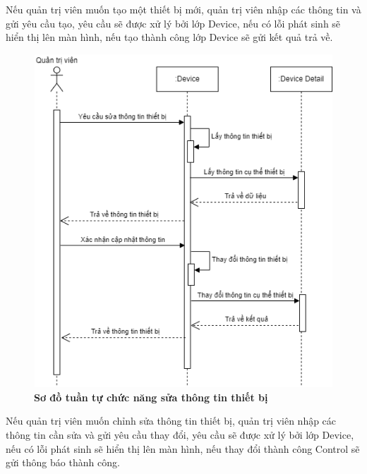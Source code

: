Nếu quản trị viên muốn tạo một thiết bị mới, quản trị viên nhập các thông tin và gửi yêu cầu tạo, yêu cầu sẽ được xử lý bởi lớp Device, nếu có lỗi phát sinh sẽ hiển thị lên màn hình, 
nếu tạo thành công lớp Device sẽ gửi kết quả trả về. 
\begin{figure}[H]
  \centering
  \includegraphics[width=13cm,height=12.5cm]{Images/sequence/sequence_manage_edit_device.png}
  \caption[Sơ đồ tuần tự chức năng sửa thông tin thiết bị]{\bfseries \fontsize{12pt}{0pt}
  \selectfont Sơ đồ tuần tự chức năng sửa thông tin thiết bị}
  \label{sequence_manage_edit_device} %
\end{figure}
Nếu quản trị viên muốn chỉnh sửa thông tin thiết bị, quản trị viên nhập các thông tin cần sửa và gửi yêu cầu thay đổi, yêu cầu sẽ được xử lý
bởi lớp Device, nếu có lỗi phát sinh sẽ hiển thị lên màn hình, nếu thay đổi thành công Control sẽ gửi thông báo thành công. 
